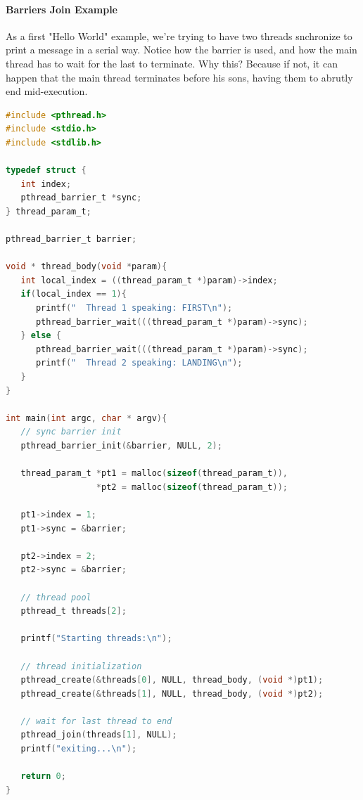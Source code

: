 \documentclass{article}
\begin{document}
				\paragraph{Barriers Join Example}
					As a first "Hello World" example, we're trying to have two threads snchronize to print a message in a serial way. Notice how the barrier is used, and how the main thread has to wait for the last to terminate. Why this? Because if not, it can happen that the main thread terminates before his sons, having them to abrutly end mid-execution.
					\begin{lstlisting}[language = c]
#include <pthread.h>
#include <stdio.h>
#include <stdlib.h>

typedef struct {
   int index;
   pthread_barrier_t *sync;
} thread_param_t;

pthread_barrier_t barrier;

void * thread_body(void *param){
   int local_index = ((thread_param_t *)param)->index;
   if(local_index == 1){
      printf("  Thread 1 speaking: FIRST\n");
      pthread_barrier_wait(((thread_param_t *)param)->sync);
   } else {
      pthread_barrier_wait(((thread_param_t *)param)->sync);
      printf("  Thread 2 speaking: LANDING\n");
   }
}

int main(int argc, char * argv){
   // sync barrier init
   pthread_barrier_init(&barrier, NULL, 2);

   thread_param_t *pt1 = malloc(sizeof(thread_param_t)),
                  *pt2 = malloc(sizeof(thread_param_t));

   pt1->index = 1;
   pt1->sync = &barrier;

   pt2->index = 2;
   pt2->sync = &barrier;

   // thread pool
   pthread_t threads[2];

   printf("Starting threads:\n");

   // thread initialization
   pthread_create(&threads[0], NULL, thread_body, (void *)pt1);
   pthread_create(&threads[1], NULL, thread_body, (void *)pt2);

   // wait for last thread to end
   pthread_join(threads[1], NULL);
   printf("exiting...\n");

   return 0;
}
					\end{lstlisting}
				

				
\end{document}
